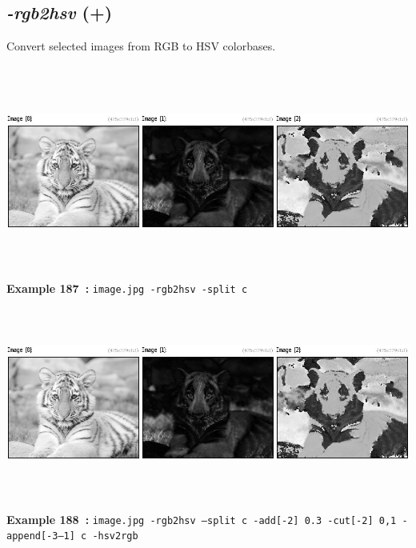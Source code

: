 \documentclass[a4paper,11pt,twoside]{book}
\begin{document}
\subsection{\emph{-rgb2hsv} (+)}\vspace*{-0.5em}
Convert selected images from RGB to HSV colorbases.
\begin{center}\includegraphics[keepaspectratio=true,height=7cm,width=\textwidth]{img/gmic_def187.jpg}\\
{\footnotesize \textbf{Example 187~:} \texttt{image.jpg -rgb2hsv -split c}}
\\\includegraphics[keepaspectratio=true,height=7cm,width=\textwidth]{img/gmic_def188.jpg}\\
{\footnotesize \textbf{Example 188~:} \texttt{image.jpg -rgb2hsv --split c -add[-2] 0.3 -cut[-2] 0,1 -append[-3--1] c -hsv2rgb}}
\end{center}
\end{document}
